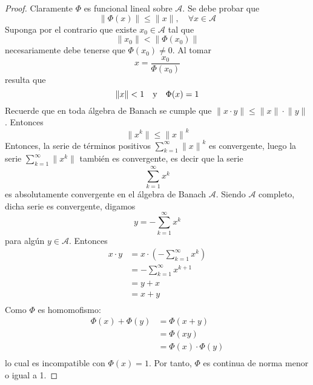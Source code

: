 \documentclass[12pt]{report}
\newcounter{it}
\theoremstyle{largebreak}
\renewcommand{\leq}{\ensuremath{\leqslant}}
\newcommand\norm[1]{\ensuremath{\|#1\|}}
\begin{document}
    \begin{proof}
        Claramente $\Phi$ es funcional lineal sobre $\mathcal{A}$. Se debe probar que
        \begin{equation*}
            \norm{\Phi(x)}\leq\norm{x},\quad\forall x\in\mathcal{A}
        \end{equation*}
        Suponga por el contrario que existe $x_0\in\mathcal{A}$ tal que
        \begin{equation*}
            \norm{x_0}<\norm{\Phi(x_0)}
        \end{equation*}
        necesariamente debe tenerse que $\Phi(x_0)\neq0$. Al tomar
        \begin{equation*}
            x=\frac{x_0}{\Phi(x_0)}
        \end{equation*}
        resulta que
        \begin{equation*}
            \norm{x}<1\quad\textup{y}\quad\Phi(x)=1
        \end{equation*}
        Recuerde que en toda álgebra de Banach se cumple que $\norm{x\cdot y}\leq\norm{x}\cdot\norm{y}$. Entonces
        \begin{equation*}
            \norm{x^k}\leq\norm{x}^k
        \end{equation*}
        Entonces, la serie de términos positivos $\sum_{ k=1}^\infty\norm{x}^k$ es convergente, luego la serie $\sum_{ k=1}^\infty\norm{x^k}$ también es convergente, es decir que la serie
        \begin{equation*}
            \sum_{ k=1}^\infty x^k
        \end{equation*}
        es absolutamente convergente en el álgebra de Banach $\mathcal{A}$. Siendo $\mathcal{A}$ completo, dicha serie es convergente, digamos
        \begin{equation*}
            y=-\sum_{ k=1}^\infty x^k
        \end{equation*}
        para algún $y\in\mathcal{A}$. Entonces
        \begin{equation*}
            \begin{split}
                x\cdot y&=x\cdot\left(-\sum_{ k=1}^\infty x^k\right)\\
                &=-\sum_{ k=1}^\infty x^{ k+1}\\
                &=y+x\\
                &=x+y\\
            \end{split}
        \end{equation*}
        Como $\Phi$ es homomofismo:
        \begin{equation*}
            \begin{split}
                \Phi(x)+\Phi(y)&=\Phi(x+y)\\
                &=\Phi(x y)\\
                &=\Phi(x)\cdot\Phi(y)\\
            \end{split}
        \end{equation*}
        lo cual es incompatible con $\Phi(x)=1$. Por tanto, $\Phi$ es continua de norma menor o igual a 1.
    \end{proof}
\end{document}
